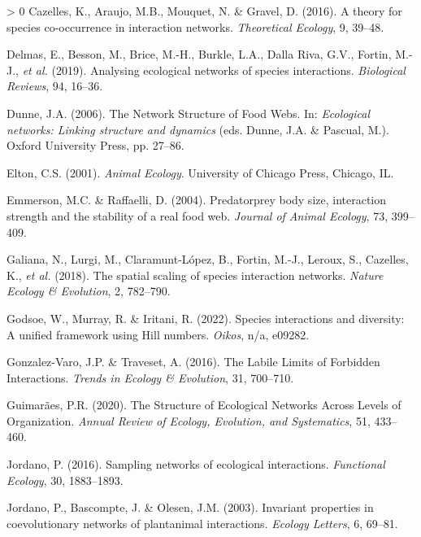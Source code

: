 \documentclass[10pt,oneside]{article}
\newlength{\cslhangindent}
\newenvironment{CSLReferences}[3] %
 {%
  \setlength{\parindent}{0pt}
  \ifodd #1 \everypar{\setlength{\hangindent}{\cslhangindent}}\ignorespaces\fi
  \ifnum #2 > 0
  \setlength{\parskip}{#2\baselineskip}
  \fi
 }%
 {}
\begin{document}
\begin{CSLReferences}{1}{0}
\leavevmode\hypertarget{ref-Cazelles2016Theorya}{}%
Cazelles, K., Araujo, M.B., Mouquet, N. \& Gravel, D. (2016). A theory
for species co-occurrence in interaction networks. \emph{Theoretical
Ecology}, 9, 39--48.

\leavevmode\hypertarget{ref-Delmas2019Analysing}{}%
Delmas, E., Besson, M., Brice, M.-H., Burkle, L.A., Dalla Riva, G.V.,
Fortin, M.-J., \emph{et al.} (2019). Analysing ecological networks of
species interactions. \emph{Biological Reviews}, 94, 16--36.

\leavevmode\hypertarget{ref-Dunne2006Network}{}%
Dunne, J.A. (2006). The Network Structure of Food Webs. In:
\emph{Ecological networks: Linking structure and dynamics} (eds. Dunne,
J.A. \& Pascual, M.). Oxford University Press, pp. 27--86.

\leavevmode\hypertarget{ref-Elton2001Animal}{}%
Elton, C.S. (2001). \emph{Animal Ecology}. University of Chicago Press,
Chicago, IL.

\leavevmode\hypertarget{ref-Emmerson2004PrePre}{}%
Emmerson, M.C. \& Raffaelli, D. (2004). Predatorprey body size,
interaction strength and the stability of a real food web. \emph{Journal
of Animal Ecology}, 73, 399--409.

\leavevmode\hypertarget{ref-Galiana2018SpaSca}{}%
Galiana, N., Lurgi, M., Claramunt-López, B., Fortin, M.-J., Leroux, S.,
Cazelles, K., \emph{et al.} (2018). The spatial scaling of species
interaction networks. \emph{Nature Ecology \& Evolution}, 2, 782--790.

\leavevmode\hypertarget{ref-Godsoe2022Species}{}%
Godsoe, W., Murray, R. \& Iritani, R. (2022). Species interactions and
diversity: A unified framework using Hill numbers. \emph{Oikos}, n/a,
e09282.

\leavevmode\hypertarget{ref-Gonzalez-Varo2016Labilea}{}%
Gonzalez-Varo, J.P. \& Traveset, A. (2016). The Labile Limits of
Forbidden Interactions. \emph{Trends in Ecology \& Evolution}, 31,
700--710.

\leavevmode\hypertarget{ref-Guimaraes2020Structurea}{}%
Guimarães, P.R. (2020). The Structure of Ecological Networks Across
Levels of Organization. \emph{Annual Review of Ecology, Evolution, and
Systematics}, 51, 433--460.

\leavevmode\hypertarget{ref-Jordano2016SamNet}{}%
Jordano, P. (2016). Sampling networks of ecological interactions.
\emph{Functional Ecology}, 30, 1883--1893.

\leavevmode\hypertarget{ref-Jordano2003Invarianta}{}%
Jordano, P., Bascompte, J. \& Olesen, J.M. (2003). Invariant properties
in coevolutionary networks of plantanimal interactions. \emph{Ecology
Letters}, 6, 69--81.


\end{CSLReferences}
\end{document}
